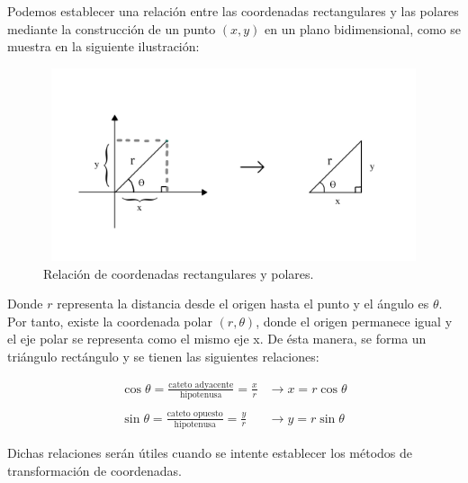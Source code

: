 Podemos establecer una relación entre las coordenadas rectangulares y las polares mediante la construcción de un punto ${\left(x,y\right)}$ en un plano bidimensional, como se muestra en la siguiente ilustración:

\begin{figure}[H]
  \centering
  \includegraphics[width=11.17cm, height=5.67cm]{img/graph/relacion_r}
  \caption{Relación de coordenadas rectangulares y polares.}
  \label{relacion_de_coordenadas}
\end{figure}

Donde ${r}$ representa la distancia desde el origen hasta el punto y el ángulo es ${\theta}$. Por tanto, existe la coordenada polar ${\left(r,\theta\right)}$, donde el origen permanece igual y el eje polar se representa como el mismo eje x. De ésta manera, se forma un triángulo rectángulo y se tienen las siguientes relaciones:

\begin{eqnarray*}
  \cos\theta = \frac{\text{cateto adyacente}}{\text{hipotenusa}} = \frac{x}{r} &\rightarrow x = r\cos\theta\\\\
  \sin\theta = \frac{\text{cateto opuesto}}{\text{hipotenusa}} = \frac{y}{r} &\rightarrow y = r\sin\theta
\end{eqnarray*}

\vspace{4mm}
Dichas relaciones serán útiles cuando se intente establecer los métodos de transformación de coordenadas.

